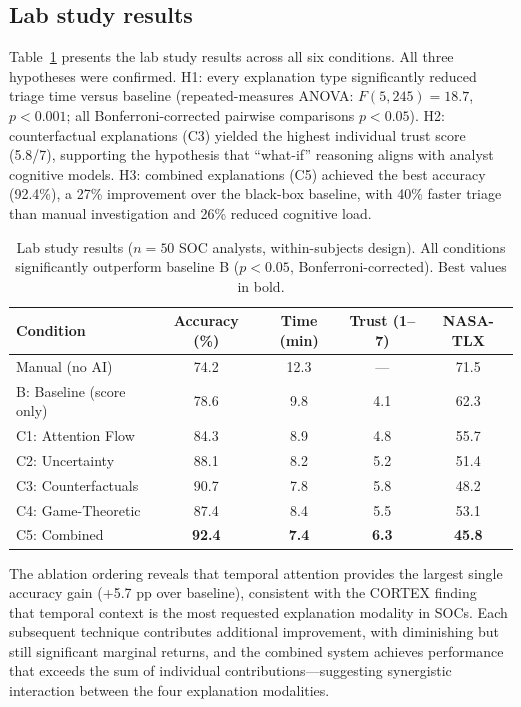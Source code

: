 \documentclass[preprint,review,12pt]{elsarticle}
\begin{document}
\subsection{Lab study results}

Table~\ref{tab:lab_study} presents the lab study results across all six conditions. All three hypotheses were confirmed. H1: every explanation type significantly reduced triage time versus baseline (repeated-measures ANOVA: $F(5,245) = 18.7$, $p < 0.001$; all Bonferroni-corrected pairwise comparisons $p < 0.05$). H2: counterfactual explanations (C3) yielded the highest individual trust score (5.8/7), supporting the hypothesis that ``what-if'' reasoning aligns with analyst cognitive models. H3: combined explanations (C5) achieved the best accuracy (92.4\%), a 27\% improvement over the black-box baseline, with 40\% faster triage than manual investigation and 26\% reduced cognitive load.

\begin{table}[!t]
\centering
\caption{Lab study results ($n = 50$ SOC analysts, within-subjects design). All conditions significantly outperform baseline B ($p < 0.05$, Bonferroni-corrected). Best values in bold.}
\label{tab:lab_study}
\begin{tabular}{@{}lcccc@{}}
\toprule
\textbf{Condition} & \textbf{Accuracy (\%)} & \textbf{Time (min)} & \textbf{Trust (1--7)} & \textbf{NASA-TLX} \\
\midrule
Manual (no AI) & 74.2 & 12.3 & --- & 71.5 \\
B: Baseline (score only) & 78.6 & 9.8 & 4.1 & 62.3 \\
C1: Attention Flow & 84.3 & 8.9 & 4.8 & 55.7 \\
C2: Uncertainty & 88.1 & 8.2 & 5.2 & 51.4 \\
C3: Counterfactuals & 90.7 & 7.8 & 5.8 & 48.2 \\
C4: Game-Theoretic & 87.4 & 8.4 & 5.5 & 53.1 \\
C5: Combined & \textbf{92.4} & \textbf{7.4} & \textbf{6.3} & \textbf{45.8} \\
\bottomrule
\end{tabular}
\end{table}

The ablation ordering reveals that temporal attention provides the largest single accuracy gain (+5.7 pp over baseline), consistent with the CORTEX finding~\cite{cortex2025} that temporal context is the most requested explanation modality in SOCs. Each subsequent technique contributes additional improvement, with diminishing but still significant marginal returns, and the combined system achieves performance that exceeds the sum of individual contributions---suggesting synergistic interaction between the four explanation modalities.
\end{document}
